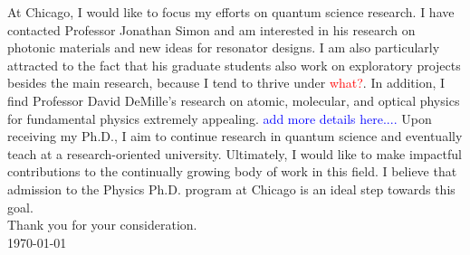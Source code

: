 \documentclass[12pt]{article}
\begin{document}
At Chicago, I would like to focus my efforts on quantum science research. I have contacted Professor Jonathan Simon and am interested in his research on photonic materials and new ideas for resonator designs. I am also particularly attracted to the fact that his graduate students also work on exploratory projects besides the main research, because I tend to thrive under \textcolor{red}{what?}. In addition, I find Professor David DeMille's research on atomic, molecular, and optical physics for fundamental physics extremely appealing. \textcolor{blue}{add more details here.... } Upon receiving my Ph.D., I aim to continue research in quantum science and eventually teach at a research-oriented university. Ultimately, I would like to make impactful contributions to the continually growing body of work in this field. I believe that admission to the Physics Ph.D. program at Chicago is an ideal step towards this goal. \\

\noindent Thank you for your consideration. \\

\noindent \today
	











	
	
	
	
	
\end{document}
